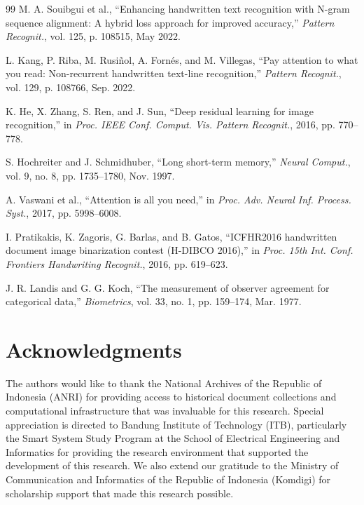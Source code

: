 \documentclass[journal]{IEEEtran}
\begin{document}
\begin{thebibliography}{99}
M. A. Souibgui et al., ``Enhancing handwritten text recognition with N-gram sequence alignment: A hybrid loss approach for improved accuracy,'' \textit{Pattern Recognit.}, vol. 125, p. 108515, May 2022.

L. Kang, P. Riba, M. Rusiñol, A. Fornés, and M. Villegas, ``Pay attention to what you read: Non-recurrent handwritten text-line recognition,'' \textit{Pattern Recognit.}, vol. 129, p. 108766, Sep. 2022.

K. He, X. Zhang, S. Ren, and J. Sun, ``Deep residual learning for image recognition,'' in \textit{Proc. IEEE Conf. Comput. Vis. Pattern Recognit.}, 2016, pp. 770--778.

S. Hochreiter and J. Schmidhuber, ``Long short-term memory,'' \textit{Neural Comput.}, vol. 9, no. 8, pp. 1735--1780, Nov. 1997.

A. Vaswani et al., ``Attention is all you need,'' in \textit{Proc. Adv. Neural Inf. Process. Syst.}, 2017, pp. 5998--6008.

I. Pratikakis, K. Zagoris, G. Barlas, and B. Gatos, ``ICFHR2016 handwritten document image binarization contest (H-DIBCO 2016),'' in \textit{Proc. 15th Int. Conf. Frontiers Handwriting Recognit.}, 2016, pp. 619--623.

J. R. Landis and G. G. Koch, ``The measurement of observer agreement for categorical data,'' \textit{Biometrics}, vol. 33, no. 1, pp. 159--174, Mar. 1977.

\end{thebibliography}
\vfill\pagebreak
\section*{Acknowledgments}

The authors would like to thank the National Archives of the Republic of Indonesia (ANRI) for providing access to historical document collections and computational infrastructure that was invaluable for this research. Special appreciation is directed to Bandung Institute of Technology (ITB), particularly the Smart System Study Program at the School of Electrical Engineering and Informatics for providing the research environment that supported the development of this research. We also extend our gratitude to the Ministry of Communication and Informatics of the Republic of Indonesia (Komdigi) for scholarship support that made this research possible.
\end{document}
